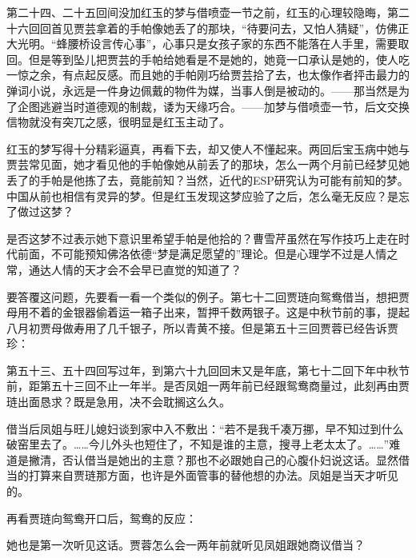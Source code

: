 \par 第二十四、二十五回间没加红玉的梦与借喷壶一节之前，红玉的心理较隐晦，第二十六回回首见贾芸拿着的手帕像她丢了的那块，“待要问去，又怕人猜疑”，仿佛正大光明。“蜂腰桥设言传心事”，心事只是女孩子家的东西不能落在人手里，需要取回。但是等到坠儿把贾芸的手帕给她看是不是她的，她竟一口承认是她的，使人吃一惊之余，有点起反感。而且她的手帕刚巧给贾芸拾了去，也太像作者抨击最力的弹词小说，永远是一件身边佩戴的物件为媒，当事人倒是被动的。——那当然是为了企图逃避当时道德观的制裁，诿为天缘巧合。——加梦与借喷壶一节，后文交换信物就没有突兀之感，很明显是红玉主动了。
\par 红玉的梦写得十分精彩逼真，再看下去，却又使人不懂起来。两回后宝玉病中她与贾芸常见面，她才看见他的手帕像她从前丢了的那块，怎么一两个月前已经梦见她丢了的手帕是他拣了去，竟能前知？当然，近代的ESP研究认为可能有前知的梦。中国从前也相信有灵异的梦。但是红玉发现这梦应验了之后，怎么毫无反应？是忘了做过这梦？
\par 是否这梦不过表示她下意识里希望手帕是他拾的？曹雪芹虽然在写作技巧上走在时代前面，不可能预知佛洛依德“梦是满足愿望的”理论。但是心理学不过是人情之常，通达人情的天才会不会早已直觉的知道了？
\par 要答覆这问题，先要看一看一个类似的例子。第七十二回贾琏向鸳鸯借当，想把贾母用不着的金银器偷着运一箱子出来，暂押千数两银子。这是中秋节前的事，提起八月初贾母做寿用了几千银子，所以青黄不接。但是第五十三回贾蓉已经告诉贾珍：
\par 第五十三、五十四回写过年，到第六十九回回末又是年底，第七十二回下年中秋节前，距第五十三回不止一年半。是否凤姐一两年前已经跟鸳鸯商量过，此刻再由贾琏出面恳求？既是急用，决不会耽搁这么久。
\par 借当后凤姐与旺儿媳妇谈到家中入不敷出：“若不是我千凑万挪，早不知过到什么破窑里去了。……今儿外头也短住了，不知是谁的主意，搜寻上老太太了。……”难道是撇清，否认借当是她出的主意？那也不必跟她自己的心腹仆妇说这话。显然借当的打算来自贾琏那方面，也许是外面管事的替他想的办法。凤姐是当天才听见的。
\par 再看贾琏向鸳鸯开口后，鸳鸯的反应：
\par 她也是第一次听见这话。贾蓉怎么会一两年前就听见凤姐跟她商议借当？
